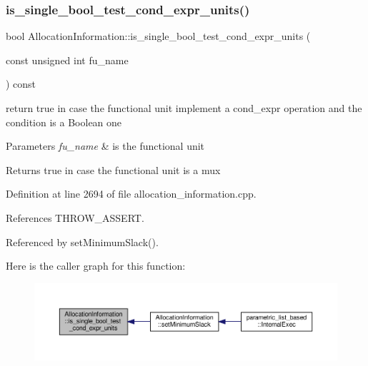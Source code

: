 \subsubsection{\texorpdfstring{is\+\_\+single\+\_\+bool\+\_\+test\+\_\+cond\+\_\+expr\+\_\+units()}{is\_single\_bool\_test\_cond\_expr\_units()}}
{\footnotesize\ttfamily bool Allocation\+Information\+::is\+\_\+single\+\_\+bool\+\_\+test\+\_\+cond\+\_\+expr\+\_\+units (\begin{DoxyParamCaption}\item[{const unsigned int}]{fu\+\_\+name }\end{DoxyParamCaption}) const}



return true in case the functional unit implement a cond\+\_\+expr operation and the condition is a Boolean one 


\begin{DoxyParams}{Parameters}
{\em fu\+\_\+name} & is the functional unit \\
\hline
\end{DoxyParams}
\begin{DoxyReturn}{Returns}
true in case the functional unit is a mux 
\end{DoxyReturn}


Definition at line 2694 of file allocation\+\_\+information.\+cpp.



References T\+H\+R\+O\+W\+\_\+\+A\+S\+S\+E\+RT.



Referenced by set\+Minimum\+Slack().

Here is the caller graph for this function\+:
\nopagebreak
\begin{figure}[H]
\begin{center}
\leavevmode
\includegraphics[width=350pt]{d7/d79/classAllocationInformation_a6e8cf3c7fb4095970b073e0281907e18_icgraph}
\end{center}
\end{figure}
\mbox{\label{classAllocationInformation_adf7ae2a5e871e9c6ae0a858b5038c68d}} 
